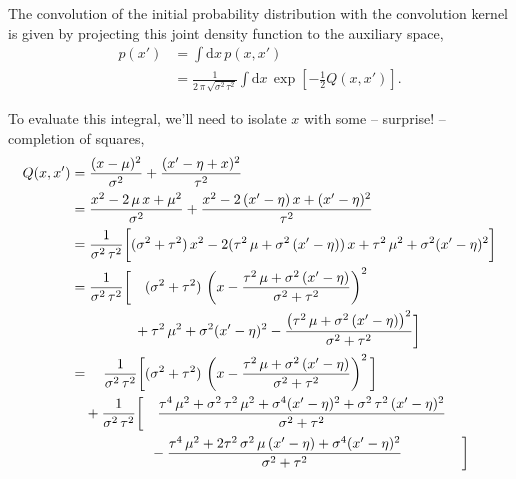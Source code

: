 \documentclass[
  letterpaper,
  DIV=11,
  numbers=noendperiod]{scrartcl}
\begin{document}
The convolution of the initial probability distribution with the
convolution kernel is given by projecting this joint density function to
the auxiliary space, \begin{align*}
p( x' )
&=
\int \mathrm{d} x \, p( x, x' )
\\
&=
\frac{1}{ 2 \, \pi \, \sqrt{ \sigma^{2} \, \tau^{2} } }
\int \mathrm{d} x \,
\exp \left[
  -\frac{1}{2} Q(x, x')
\right].
\end{align*}

To evaluate this integral, we'll need to isolate \(x\) with some --
surprise! -- completion of squares, \begin{align*}
Q(x, x')
&=
  \frac{ ( x - \mu )^{2} }{ \sigma^{2} }
+ \frac{ ( x' - \eta + x )^{2} }{ \tau^{2} }
\\
&=
  \frac{ x^{2} - 2 \, \mu \, x + \mu^{2} }{ \sigma^{2} }
+ \frac{
     x^{2} - 2 \, (x' - \eta) \, x + (x' - \eta)^{2}
   }{
     \tau^{2}
   }
\\
&=
\frac{1}{ \sigma^{2} \, \tau^{2} } \bigg[
    ( \sigma^{2} + \tau^{2} ) \, x^{2}
  - 2 ( \tau^{2} \, \mu + \sigma^{2} \, (x' - \eta) ) \, x
  + \tau^{2} \, \mu^{2} + \sigma^{2} ( x' - \eta)^{2}
\bigg]
\\
&=
\frac{1}{\sigma^{2} \, \tau^{2} }
\bigg[ \quad
  ( \sigma^{2} + \tau^{2} ) \, \left(
    x -
    \frac{
      \tau^{2} \, \mu + \sigma^{2} \, (x' - \eta)
    }{
      \sigma^{2} + \tau^{2}
    }
  \right)^{2}
\\
&\hspace{16mm}
  + \tau^{2} \, \mu^{2} + \sigma^{2} ( x' - \eta)^{2}
  - \frac{
      \left(
        \tau^{2} \, \mu + \sigma^{2} \, (x' - \eta)
      \right)^{2}
    }{
      \sigma^{2} + \tau^{2}
    }
\bigg]
\\
&=\quad
\frac{1}{ \sigma^{2} \, \tau^{2} }
\bigg[
  ( \sigma^{2} + \tau^{2} ) \, \left(
    x -
    \frac{
      \tau^{2} \, \mu + \sigma^{2} \, (x' - \eta)
    }{
      \sigma^{2} + \tau^{2}
    }
  \right)^{2}
\bigg]
\\
&\quad+
\frac{1}{ \sigma^{2} \, \tau^{2} } \bigg[ \quad
    \frac{
       \tau^{4} \, \mu^{2}
     + \sigma^{2} \, \tau^{2} \, \mu^{2}
     + \sigma^{4} ( x' - \eta)^{2}
     + \sigma^{2} \, \tau^{2} \, ( x' - \eta)^{2}
    }{
      \sigma^{2} + \tau^{2}
    }
\\
&\hspace{20mm}
  - \frac{
       \tau^{4} \, \mu^{2}
     + 2 \tau^{2} \, \sigma^{2} \, \mu \, (x' - \eta)
     + \sigma^{4} (x' - \eta)^{2}
    }{
      \sigma^{2} + \tau^{2}
    }
\hspace{15mm} \bigg]

\end{align*}
\end{document}
